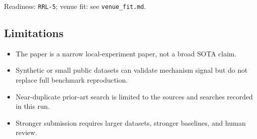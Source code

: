 \documentclass[
  11pt,
]{article}
\providecommand{\tightlist}{%
  \setlength{\itemsep}{0pt}\setlength{\parskip}{0pt}}
\begin{document}
Readiness: \texttt{RRL-5}; venue fit: see \texttt{venue\_fit.md}.

\subsection{Limitations}\label{limitations}

\begin{itemize}
\tightlist
\item
  The paper is a narrow local-experiment paper, not a broad SOTA claim.
\item
  Synthetic or small public datasets can validate mechanism signal but do not replace full benchmark reproduction.
\item
  Near-duplicate prior-art search is limited to the sources and searches recorded in this run.
\item
  Stronger submission requires larger datasets, stronger baselines, and human review.
\end{itemize}
\end{document}
